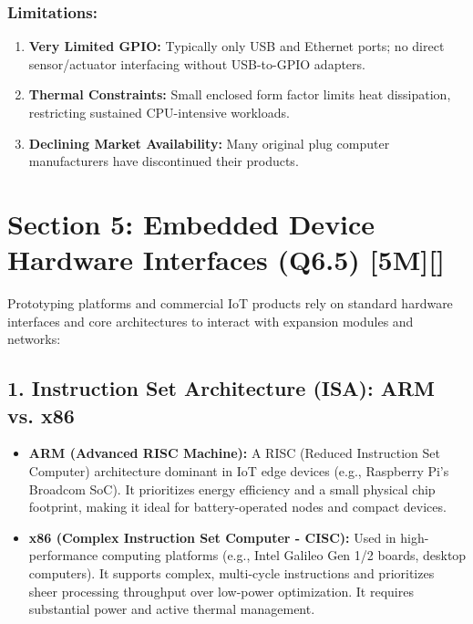 \subsubsection{Limitations:}
\begin{enumerate}
  \item \textbf{Very Limited GPIO:} Typically only USB and Ethernet ports; no direct sensor/actuator interfacing without USB-to-GPIO adapters.
  \item \textbf{Thermal Constraints:} Small enclosed form factor limits heat dissipation, restricting sustained CPU-intensive workloads.
  \item \textbf{Declining Market Availability:} Many original plug computer manufacturers have discontinued their products.
\end{enumerate}


\section{Section 5: Embedded Device Hardware Interfaces (Q6.5) [5M][]}

Prototyping platforms and commercial IoT products rely on standard hardware interfaces and core architectures to interact with expansion modules and networks:

\subsection{1. Instruction Set Architecture (ISA): ARM vs. x86}
\begin{itemize}
  \item   \textbf{ARM (Advanced RISC Machine):} A RISC (Reduced Instruction Set Computer) architecture dominant in IoT edge devices (e.g., Raspberry Pi's Broadcom SoC). It prioritizes energy efficiency and a small physical chip footprint, making it ideal for battery-operated nodes and compact devices.
  \item   \textbf{x86 (Complex Instruction Set Computer - CISC):} Used in high-performance computing platforms (e.g., Intel Galileo Gen 1/2 boards, desktop computers). It supports complex, multi-cycle instructions and prioritizes sheer processing throughput over low-power optimization. It requires substantial power and active thermal management.
\end{itemize}

